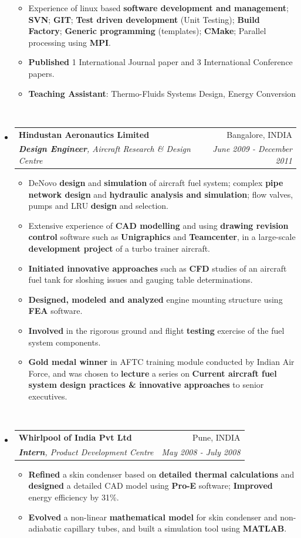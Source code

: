 \documentclass[letterpaper,11pt]{article}
\makeatletter
\newcommand{\resitem}[1]{\item #1 \vspace{-2pt}}
\newcommand{\ressubheading}[4]{
\begin{tabular*}{7.0in}{l@{\extracolsep{\fill}}r}
		\textbf{#1} & #2 \\
		\textit{#3} & \textit{#4} \\
\end{tabular*}\vspace{-6pt}}
\makeatother
\begin{document}
\begin{itemize}
\begin{itemize}
		      \resitem{{\small Experience of linux based \textbf{software development and management}; \textbf{SVN}; \textbf{GIT}; \textbf{Test driven development} (Unit Testing); \textbf{Build Factory}; \textbf{Generic programming} (templates); \textbf{CMake}; Parallel processing using \textbf{MPI}.}}
		      \resitem{{\small \textbf{Published} 1 International Journal paper and 3 International Conference papers.}}
		      \resitem{{\small \textbf{Teaching Assistant}: Thermo-Fluids Systems Design, Energy Conversion}}
	      \end{itemize} ~\\ \vspace{-10pt}
	\item
	      \ressubheading{Hindustan Aeronautics Limited}{Bangalore, INDIA}{\textbf{Design Engineer}, Aircraft Research \& Design Centre}{June 2009 - December 2011}
	      \begin{itemize}
		      \resitem{\small {DeNovo \textbf{design} and \textbf{simulation} of aircraft fuel system; complex \textbf{pipe network design} and \textbf{hydraulic analysis and simulation}; flow valves, pumps and LRU \textbf{design} and selection.}}
		      \resitem{{\small Extensive experience of \textbf{CAD modelling} and using \textbf{drawing revision control} software such as \textbf{Unigraphics} and \textbf{Teamcenter}, in a large-scale \textbf{development project} of a turbo trainer aircraft.}}
		      \resitem{{\small \textbf{Initiated innovative approaches} such as \textbf{CFD} studies of an aircraft fuel tank for sloshing issues and gauging table determinations.}}
		      \resitem{{\small \textbf{Designed, modeled and analyzed} engine mounting structure using \textbf{FEA} software.}}
		      \resitem{{\small \textbf{Involved} in the rigorous ground and flight \textbf{testing} exercise of the fuel system components.}}
		      \resitem{{\small \textbf{Gold medal winner} in AFTC training module conducted by Indian Air Force, and was chosen to \textbf{lecture} a series on \textbf{Current aircraft fuel system design practices \& innovative approaches} to senior executives.}}
	      \end{itemize} ~\\ \vspace{-10pt}
	\item
	      \ressubheading{Whirlpool of India Pvt Ltd}{Pune, INDIA}{\textbf{Intern}, Product Development Centre}{May 2008 - July 2008}
	      \begin{itemize}
		      \resitem{{\small \textbf{Refined} a skin condenser based on \textbf{detailed thermal calculations} and \textbf{designed} a detailed CAD model using \textbf{Pro-E} software; \textbf{Improved} energy efficiency by 31\%.}}
		      \resitem{{\small \textbf{Evolved} a non-linear \textbf{mathematical model} for skin condenser and non-adiabatic capillary tubes, and built a simulation tool using \textbf{MATLAB}.}}
	      \end{itemize}
\end{itemize}
\end{document}
